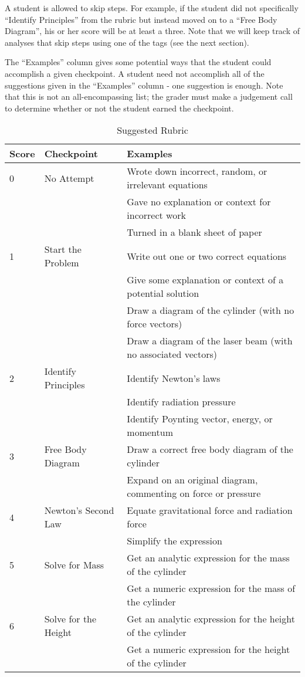 A student is allowed to skip steps. For example, if the student did not specifically ``Identify Principles'' from the rubric but instead moved on to a ``Free Body Diagram'', his or her score will be at least a three. Note that we will keep track of analyses that skip steps using one of the tags (see the next section).

The ``Examples'' column gives some potential ways that the student could accomplish a given checkpoint. A student need not accomplish all of the suggestions given in the ``Examples'' column - one suggestion is enough. Note that this is not an all-encompassing list; the grader must make a judgement call to determine whether or not the student earned the checkpoint.

\begin{table}[!ht]
  \centering
  \begin{tabular}{|l|l|l|}
    \hline
    \textbf{Score} & \textbf{Checkpoint} & \textbf{Examples}\\
	\hline
	0 & No Attempt & Wrote down incorrect, random, or irrelevant equations\\
	& & Gave no explanation or context for incorrect work\\
	& & Turned in a blank sheet of paper\\
	\hline
	1 & Start the Problem & Write out one or two correct equations\\
	& & Give some explanation or context of a potential solution\\
	& & Draw a diagram of the cylinder (with no force vectors)\\
	& & Draw a diagram of the laser beam (with no associated vectors)\\
	\hline
	2 & Identify Principles & Identify Newton's laws\\
	& & Identify radiation pressure\\
	& & Identify Poynting vector, energy, or momentum\\
	\hline
	3 & Free Body Diagram & Draw a correct free body diagram of the cylinder\\
	& & Expand on an original diagram, commenting on force or pressure\\
	\hline
	4 & Newton's Second Law & Equate gravitational force and radiation force\\
	& & Simplify the expression\\
	\hline
	5 & Solve for Mass & Get an analytic expression for the mass of the cylinder\\
	& & Get a numeric expression for the mass of the cylinder\\
	\hline
	6 & Solve for the Height & Get an analytic expression for the height of the cylinder\\
	& & Get a numeric expression for the height of the cylinder\\
	\hline
  \end{tabular}
  \caption{Suggested Rubric}
  \label{tab:rubric}
\end{table}

